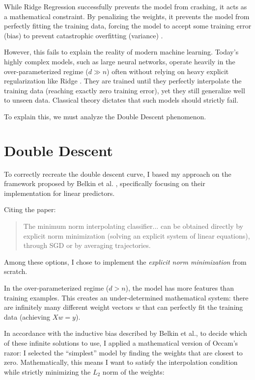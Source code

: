 \documentclass[11pt,a4paper]{article}
\begin{document}
While Ridge Regression successfully prevents the model from crashing, it acts as a mathematical constraint. By penalizing the weights, it prevents the model from perfectly fitting the training data, forcing the model to accept some training error (bias) to prevent catastrophic overfitting (variance) \cite{Hastie01102020}.

However, this fails to explain the reality of modern machine learning. Today's highly complex models, such as large neural networks, operate heavily in the over-parameterized regime ($d \gg n$) often without relying on heavy explicit regularization like Ridge \cite{zhang2016understanding}. They are trained until they perfectly interpolate the training data (reaching exactly zero training error), yet they still generalize well to unseen data. Classical theory dictates that such models should strictly fail.

To explain this, we must analyze the Double Descent phenomenon.

\section{Double Descent}

To correctly recreate the double descent curve, I based my approach on the framework proposed by Belkin et al. \cite{belkin2019reconciling}, specifically focusing on their implementation for linear predictors.

Citing the paper:

\begin{quote}
The minimum norm interpolating classifier... can be obtained directly by explicit norm minimization (solving an explicit system of linear equations), through SGD or by averaging trajectories. \cite{belkin2019reconciling}
\end{quote}

Among these options, I chose to implement the \textit{explicit norm minimization} from scratch.

In the over-parameterized regime ($d > n$), the model has more features than training examples. This creates an under-determined mathematical system: there are infinitely many different weight vectors $w$ that can perfectly fit the training data (achieving $X w = y$).

In accordance with the inductive bias described by Belkin et al., to decide which of these infinite solutions to use, I applied a mathematical version of Occam's razor: I selected the ``simplest'' model by finding the weights that are closest to zero. Mathematically, this means I want to satisfy the interpolation condition while strictly minimizing the $L_2$ norm of the weights:
\end{document}
